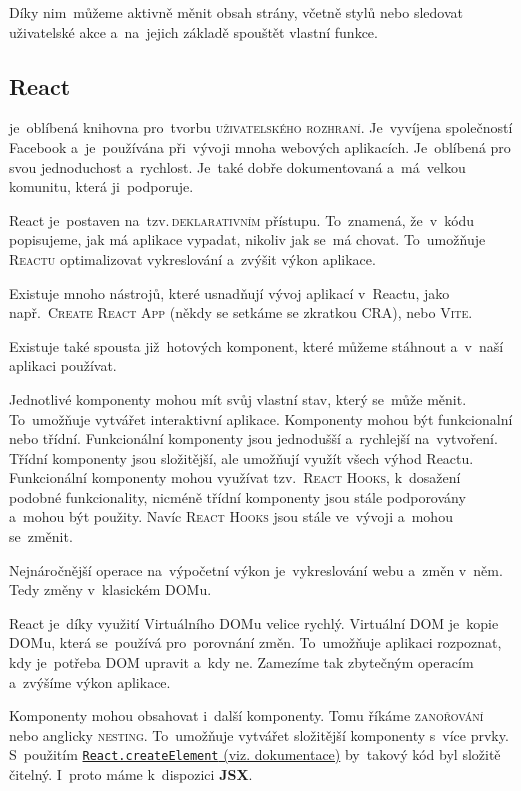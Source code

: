 \documentclass[14pt,a4paper]{article}
\begin{document}
        Díky nim~můžeme aktivně měnit obsah strány, včetně stylů nebo sledovat uživatelské akce a~na~jejich základě spouštět vlastní funkce.\parencite[2.1.01]{kantor_javascript}

        \subsection{React} je~oblíbená knihovna pro~tvorbu \textsc{uživatelského rozhraní}. Je~vyvíjena společností Facebook a~je~používána při~vývoji mnoha webových aplikacích. Je~oblíbená pro svou jednoduchost a~rychlost. Je~také dobře dokumentovaná a~má~velkou komunitu, která ji~podporuje.
        
        React je~postaven na~tzv.\,\textsc{deklarativním} přístupu. To~znamená, že~v~kódu popisujeme, jak má aplikace vypadat, nikoliv jak se~má chovat. To~umožňuje \textsc{Reactu} optimalizovat vykreslování a~zvýšit výkon aplikace.
        
        Existuje mnoho nástrojů, které usnadňují vývoj aplikací v~Reactu, jako např.~\textsc{Create React App} (někdy se setkáme se zkratkou CRA), nebo \textsc{Vite}.
        
        Existuje také spousta již~hotových komponent, které můžeme stáhnout a~v~naší aplikaci používat.


        Jednotlivé komponenty mohou mít svůj vlastní stav, který se~může měnit. To~umožňuje vytvářet interaktivní aplikace.
        Komponenty mohou být funkcionalní nebo třídní. Funkcionální komponenty jsou jednodušší a~rychlejší na~vytvoření.
        Třídní komponenty jsou složitější, ale umožňují využít všech výhod Reactu. Funkcionální komponenty mohou využívat tzv.~\textsc{React Hooks}, k~dosažení podobné funkcionality, nicméně třídní komponenty jsou stále podporovány a~mohou být použity.
        Navíc \textsc{React Hooks} jsou stále ve~vývoji a~mohou se~změnit.

        Nejnáročnější operace na~výpočetní výkon je~vykreslování webu a~změn v~něm. Tedy změny v~klasickém DOMu.

        React je~díky využití Virtuálního DOMu velice rychlý. Virtuální DOM je~kopie DOMu, která se~používá pro~porovnání změn. To~umožňuje aplikaci rozpoznat, kdy je~potřeba DOM upravit a~kdy ne. Zamezíme tak zbytečným operacím a~zvýšíme výkon aplikace. \parencite{elrom2021react}

        
        Komponenty mohou obsahovat i~další komponenty. Tomu říkáme \textsc{zanořování} nebo anglicky \textsc{nesting}. To~umožňuje vytvářet složitější komponenty s~více prvky.
        S~použitím \href{https://react.dev/reference/react/createElement}{\texttt{React.createElement} (viz. dokumentace)} by~takový kód byl složitě čitelný. I~proto máme k~dispozici \textbf{JSX}.
\end{document}
